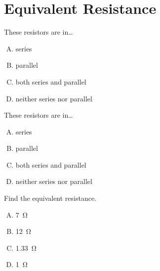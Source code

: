 \documentclass[14pt,t,dvipsnames]{beamer}
\begin{document}
\section{Equivalent Resistance}

\begin{frame}
These resistors are in\ldots

\begin{center}
\end{center}

\begin{enumerate}[A.]
    \item series
    \item \alert<2->{parallel}
    \item both series and parallel
    \item neither series nor parallel
\end{enumerate}
\end{frame}

\begin{frame}
These resistors are in\ldots

\begin{center}
\end{center}
\begin{enumerate}[A.]
    \item \alert<2->{series}
    \item parallel
    \item both series and parallel
    \item neither series nor parallel
\end{enumerate}
\end{frame}

\begin{frame}
Find the equivalent resistance.

\begin{center}
\end{center}
\begin{enumerate}[A.]
    \item \alert<2->{\SI{7}{\ohm}}
    \item \SI{12}{\ohm}
    \item \SI{1.33}{\ohm}
    \item \SI{1}{\ohm}
\end{enumerate}
\end{frame}
\end{document}
